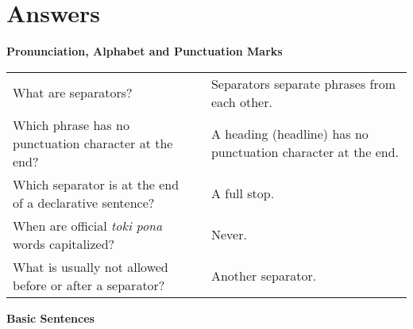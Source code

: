 \section{Answers}

\textbf{Pronunciation, Alphabet and Punctuation Marks} 
\label{'pronunciation_alphabet'}

\begin{supertabular}{p{5,5cm}|ll}
What are separators? && Separators separate phrases from each other.  \\ %
Which phrase has no punctuation character at the end? && A heading (headline) has no punctuation character at the end. \\ %
Which separator is at the end of a declarative sentence? && A full stop. \\ %
When are official \textit{toki pona} words capitalized? && Never. \\ %
What is usually not allowed before or after a separator? && Another separator. \\ %
\end{supertabular} 

\textbf{Basic Sentences} 
\label{'basic_sentences'}

